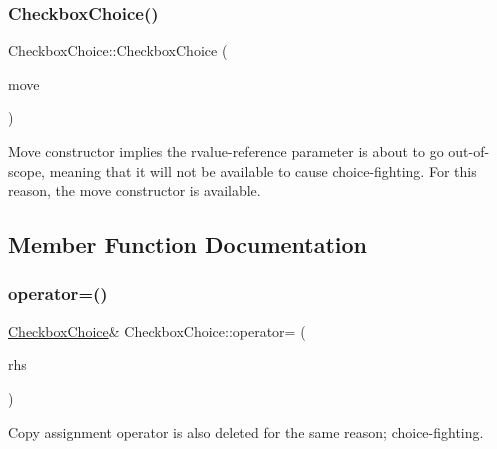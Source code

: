 \subsubsection{\texorpdfstring{Checkbox\+Choice()}{CheckboxChoice()}\hspace{0.1cm}{\footnotesize\ttfamily [4/4]}}
{\footnotesize\ttfamily Checkbox\+Choice\+::\+Checkbox\+Choice (\begin{DoxyParamCaption}\item[{\mbox{\hyperlink{class_checkbox_choice}{Checkbox\+Choice}} \&\&}]{move }\end{DoxyParamCaption})\hspace{0.3cm}{\ttfamily [default]}}

Move constructor implies the rvalue-\/reference parameter is about to go out-\/of-\/scope, meaning that it will not be available to cause choice-\/fighting. For this reason, the move constructor is available. 

\subsection{Member Function Documentation}
\mbox{\label{class_checkbox_choice_a8e99359a312be66fed6837c768e9e184}} 
\subsubsection{\texorpdfstring{operator=()}{operator=()}\hspace{0.1cm}{\footnotesize\ttfamily [1/2]}}
{\footnotesize\ttfamily \mbox{\hyperlink{class_checkbox_choice}{Checkbox\+Choice}}\& Checkbox\+Choice\+::operator= (\begin{DoxyParamCaption}\item[{const \mbox{\hyperlink{class_checkbox_choice}{Checkbox\+Choice}} \&}]{rhs }\end{DoxyParamCaption})\hspace{0.3cm}{\ttfamily [delete]}}

Copy assignment operator is also deleted for the same reason; choice-\/fighting. \mbox{\label{class_checkbox_choice_a8afcd170a63e030912620c18b0527fe8}} 
